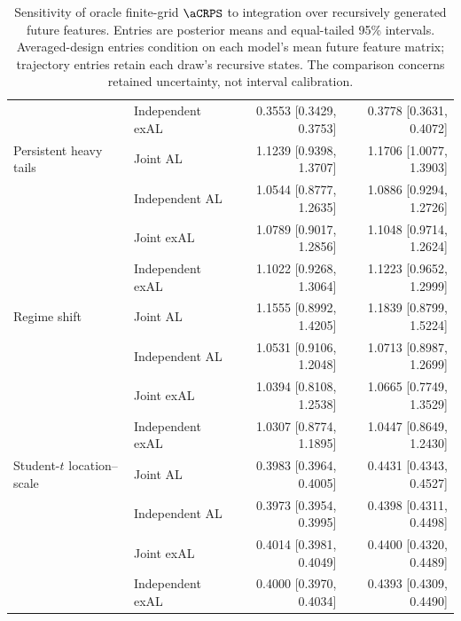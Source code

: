 \begin{table}[p]
\begin{tabular}{@{}>{\raggedright\arraybackslash}p{}lrr@{}}
 & Independent exAL & 0.3553 [0.3429, 0.3753] & 0.3778 [0.3631, 0.4072] \\
\addlinespace[2pt]
Persistent heavy tails & Joint AL & 1.1239 [0.9398, 1.3707] & 1.1706 [1.0077, 1.3903] \\
 & Independent AL & 1.0544 [0.8777, 1.2635] & 1.0886 [0.9294, 1.2726] \\
 & Joint exAL & 1.0789 [0.9017, 1.2856] & 1.1048 [0.9714, 1.2624] \\
 & Independent exAL & 1.1022 [0.9268, 1.3064] & 1.1223 [0.9652, 1.2999] \\
\addlinespace[2pt]
Regime shift & Joint AL & 1.1555 [0.8992, 1.4205] & 1.1839 [0.8799, 1.5224] \\
 & Independent AL & 1.0531 [0.9106, 1.2048] & 1.0713 [0.8987, 1.2699] \\
 & Joint exAL & 1.0394 [0.8108, 1.2538] & 1.0665 [0.7749, 1.3529] \\
 & Independent exAL & 1.0307 [0.8774, 1.1895] & 1.0447 [0.8649, 1.2430] \\
\addlinespace[2pt]
Student-\(t\) location--scale & Joint AL & 0.3983 [0.3964, 0.4005] & 0.4431 [0.4343, 0.4527] \\
 & Independent AL & 0.3973 [0.3954, 0.3995] & 0.4398 [0.4311, 0.4498] \\
 & Joint exAL & 0.4014 [0.3981, 0.4049] & 0.4400 [0.4320, 0.4489] \\
 & Independent exAL & 0.4000 [0.3970, 0.4034] & 0.4393 [0.4309, 0.4490] \\
\bottomrule
\end{tabular}
\caption{Sensitivity of oracle finite-grid \(\aCRPS\) to integration over recursively generated future features. Entries are posterior means and equal-tailed 95\% intervals. Averaged-design entries condition on each model's mean future feature matrix; trajectory entries retain each draw's recursive states. The comparison concerns retained uncertainty, not interval calibration.}
\label{tab:joint-qdesn-pure-desn-v2-recursive-policy}
\end{table}
